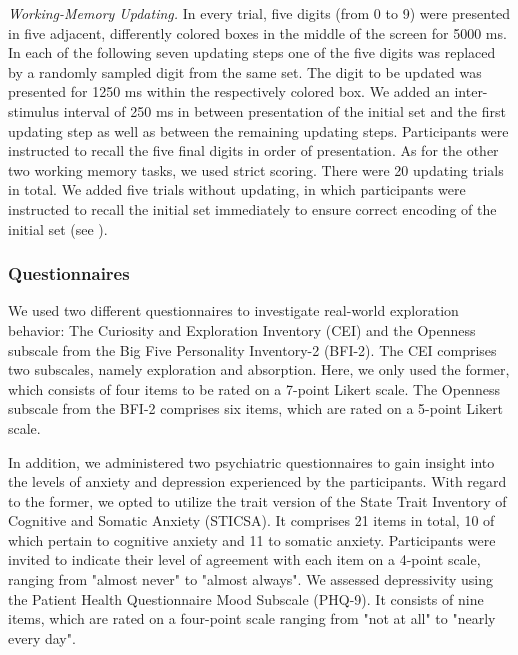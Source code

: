 \documentclass[fleqn,10pt]{wlscirep}
\begin{document}
\noindent \textit{Working-Memory Updating.} 
In every trial, five digits (from 0 to 9) were presented in five adjacent, differently colored boxes in the middle of the screen for 5000 ms. In each of the following seven updating steps one of the five digits was replaced by a randomly sampled digit from the same set. The digit to be updated was presented for 1250 ms within the respectively colored box. We added an inter-stimulus interval of 250 ms in between presentation of the initial set and the first updating step as well as between the remaining updating steps. Participants were instructed to recall the five final digits in order of presentation. As for the other two working memory tasks, we used strict scoring. There were 20 updating trials in total. We added five trials without updating, in which participants were instructed to recall the initial set immediately to ensure correct encoding of the initial set (see \cite{von_bastian_no_2016}).

\subsubsection*{Questionnaires}

We used two different questionnaires to investigate real-world exploration behavior: The Curiosity and Exploration Inventory (CEI)\cite{kashdan2004curiosity} and the Openness subscale from the Big Five Personality Inventory-2 (BFI-2)\cite{soto2017short}. The CEI comprises two subscales, namely exploration and absorption. Here, we only used the former, which consists of four items to be rated on a 7-point Likert scale. The Openness subscale from the BFI-2 comprises six items, which are rated on a 5-point Likert scale. 

In addition, we administered two psychiatric questionnaires to gain insight into the levels of anxiety and depression experienced by the participants. With regard to the former, we opted to utilize the trait version of the State Trait Inventory of Cognitive and Somatic Anxiety (STICSA)\cite{ree2008distinguishing}. It comprises 21 items in total, 10 of which pertain to cognitive anxiety and 11 to somatic anxiety. Participants were invited to indicate their level of agreement with each item on a 4-point scale, ranging from "almost never" to "almost always". We assessed depressivity using the Patient Health Questionnaire Mood Subscale (PHQ-9)\cite{kroenke2001phq}. It consists of nine items, which are rated on a four-point scale ranging from "not at all" to "nearly every day".
\end{document}
